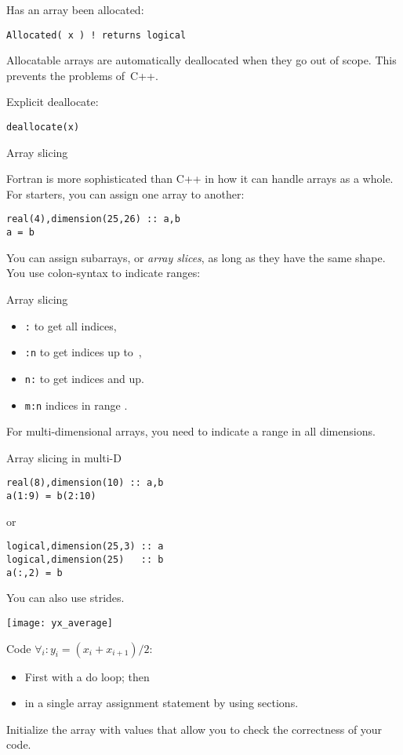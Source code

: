 Has an array been allocated:
\begin{verbatim}
Allocated( x ) ! returns logical
\end{verbatim}

Allocatable arrays are automatically deallocated when they go out of
scope. This prevents the  problems of~C++.

Explicit deallocate:
\begin{verbatim}
deallocate(x)
\end{verbatim}

 {Array slicing}

Fortran is more sophisticated than C++ in how it can handle arrays as
a whole. For starters, you can assign one array to another:
\begin{verbatim}
real(4),dimension(25,26) :: a,b
a = b
\end{verbatim}
You can assign subarrays, or \emph{array slices},
as long as they have the same shape. You use colon-syntax to indicate
ranges:

\begin{block}{Array slicing}
  \label{sl:farray-slices}
  \begin{itemize}
  \item {\tt :} %
    to get all indices,
  \item {\tt :n} %
    to get indices up to~,
  \item {\tt n:} %
    to get indices  and up.
  \item {\tt m:n}
    indices in range .
  \end{itemize}
\end{block}

For multi-dimensional arrays, you need to indicate a range in all
dimensions.

\begin{block}{Array slicing in multi-D}
  \label{sl:farray-sliced}
\begin{verbatim}
real(8),dimension(10) :: a,b
a(1:9) = b(2:10)
\end{verbatim}
or
\begin{verbatim}
logical,dimension(25,3) :: a
logical,dimension(25)   :: b
a(:,2) = b
\end{verbatim}
You can also use strides.
\end{block}

\begin{exercise}
  \label{ex:farray-shift}

  \texttt{[image: yx\_average]}

  Code $\forall_i\colon y_i=(x_i+x_{i+1})/2$:
  \begin{itemize}
  \item First with a do loop; then
  \item in a single array assignment statement by using sections.
  \end{itemize}
  Initialize the array  with values that allow you to check the
  correctness of your code.
\end{exercise}


